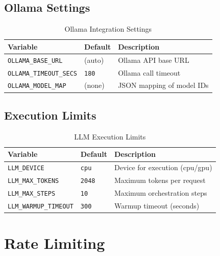 \subsection{Ollama Settings}

\begin{table}[ht]
\centering
\caption{Ollama Integration Settings}
\label{tab:config-ollama}
\small
\begin{tabularx}{\textwidth}{llX}
    \hline
    \textbf{Variable} & \textbf{Default} & \textbf{Description} \\
    \hline
    \texttt{OLLAMA\_BASE\_URL} & (auto) & Ollama API base URL \\
    \texttt{OLLAMA\_TIMEOUT\_SECS} & \texttt{180} & Ollama call timeout \\
    \texttt{OLLAMA\_MODEL\_MAP} & (none) & JSON mapping of model IDs \\
    \hline
\end{tabularx}
\end{table}

\subsection{Execution Limits}

\begin{table}[ht]
\centering
\caption{LLM Execution Limits}
\label{tab:config-llm-limits}
\small
\begin{tabularx}{\textwidth}{llX}
    \hline
    \textbf{Variable} & \textbf{Default} & \textbf{Description} \\
    \hline
    \texttt{LLM\_DEVICE} & \texttt{cpu} & Device for execution (cpu/gpu) \\
    \texttt{LLM\_MAX\_TOKENS} & \texttt{2048} & Maximum tokens per request \\
    \texttt{LLM\_MAX\_STEPS} & \texttt{10} & Maximum orchestration steps \\
    \texttt{LLM\_WARMUP\_TIMEOUT} & \texttt{300} & Warmup timeout (seconds) \\
    \hline
\end{tabularx}
\end{table}

\section{Rate Limiting}
\label{app:config:ratelimit}

